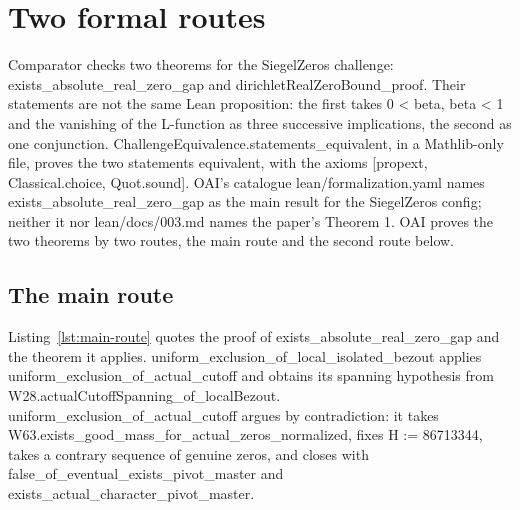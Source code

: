 \section{Two formal routes}\label{sec:gap}

Comparator checks two theorems for the SiegelZeros challenge: exists\_absolute\_real\_zero\_gap and dirichletRealZeroBound\_proof. %
Their statements are not the same Lean proposition: the first takes 0 < beta, beta < 1 and the vanishing of the L-function as three successive implications, the second as one conjunction. %
ChallengeEquivalence.statements\_equivalent, in a Mathlib-only file, proves the two statements equivalent, with the axioms [propext, Classical.choice, Quot.sound]. %
OAI's catalogue lean/formalization.yaml names exists\_absolute\_real\_zero\_gap as the main result for the SiegelZeros config; neither it nor lean/docs/003.md names the paper's Theorem 1. %
OAI proves the two theorems by two routes, the main route and the second route below. %

\subsection{The main route}

Listing~\ref{lst:main-route} quotes the proof of exists\_absolute\_real\_zero\_gap and the theorem it applies. %
uniform\_exclusion\_of\_local\_isolated\_bezout applies uniform\_exclusion\_of\_actual\_cutoff and obtains its spanning hypothesis from W28.actualCutoffSpanning\_of\_localBezout. %
uniform\_exclusion\_of\_actual\_cutoff argues by contradiction: it takes W63.exists\_good\_mass\_for\_actual\_zeros\_normalized, fixes H := 86713344, takes a contrary sequence of genuine zeros, and closes with false\_of\_eventual\_exists\_pivot\_master and exists\_actual\_character\_pivot\_master. %

